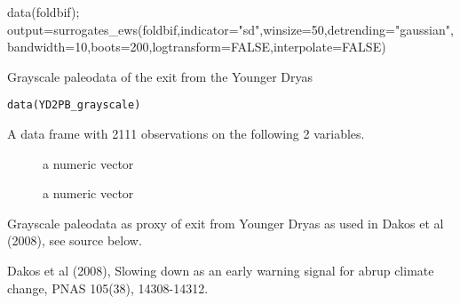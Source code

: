 \documentclass[a4paper]{book}
\begin{document}
%
\begin{Examples}
\begin{ExampleCode}
data(foldbif);
output=surrogates_ews(foldbif,indicator="sd",winsize=50,detrending="gaussian",
bandwidth=10,boots=200,logtransform=FALSE,interpolate=FALSE)
\end{ExampleCode}
\end{Examples}
%
\begin{Description}\relax
Grayscale paleodata of the exit from the Younger Dryas

\end{Description}
%
\begin{Usage}
\begin{verbatim}
data(YD2PB_grayscale)
\end{verbatim}
\end{Usage}
%
\begin{Format}
A data frame with 2111 observations on the following 2 variables.
\begin{description}

\item[] a numeric vector
\item[] a numeric vector

\end{description}

\end{Format}
%
\begin{Details}\relax
Grayscale paleodata as proxy of exit from Younger Dryas as used in Dakos et al (2008), see source below.

\end{Details}
%
\begin{Source}\relax
Dakos et al (2008), Slowing down as an early warning signal for abrup climate change, PNAS 105(38), 14308-14312.

\end{Source}
\printindex{}
\end{document}
